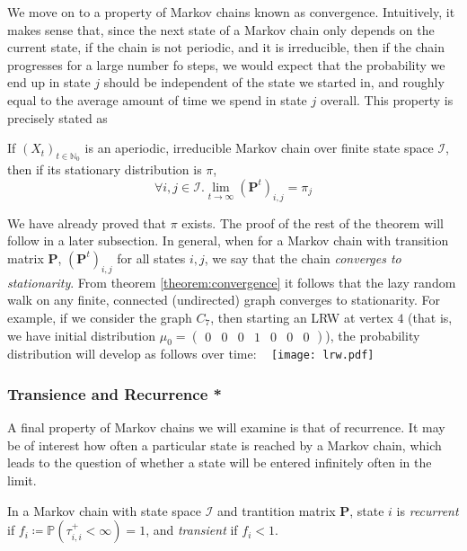 			We move on to a property of Markov chains known as convergence. Intuitively, it makes 
			sense that, since the next state of a Markov chain only depends on the current state,
			if the chain is not periodic, and it is irreducible, then if the chain progresses for
			a large number fo steps, we would expect that the probability we end up in state $j$
			should be independent of the state we started in, and roughly equal to the average amount 
			of time we spend in state $j$ overall. This property is precisely stated as 
			\begin{theorem}
				\label{theorem:convergence}
				If $(X_t)_{t \in \mathbb{N}_0}$ is an aperiodic, irreducible Markov chain over
				finite state space $\mathcal{I}$, then if its stationary distribution is $\pi$,
				$$
					\forall i, j \in \mathcal{I} . \lim_{t \rightarrow \infty} 
					(\mathbf{P}^t)_{i,j} = \pi_j
				$$
			\end{theorem}
			We have already proved that $\pi$ exists. The proof of the rest of the theorem will 
			follow in a later subsection. In general, when for a Markov chain with transition matrix
			$\mathbf{P}$, $(\mathbf{P}^t)_{i,j}$ for all states $i,j$, we say that the chain 
			\emph{converges to stationarity}. From theorem \ref{theorem:convergence} it follows
			that the lazy random walk on any finite, connected (undirected) graph converges to 
			stationarity. For example, if we consider the graph $C_7$, then starting an LRW at 
			vertex $4$ (that is, we have initial distribution $\mu_0 = \begin{pmatrix} 0 & 0 & 0 
			& 1 & 0 & 0 & 0\end{pmatrix}$), the probability distribution will develop as follows over 
			time: \newline\ \newline
			\texttt{[image: lrw.pdf]}
                           	
		\subsubsection{Transience and Recurrence *}
			A final property of Markov chains we will examine is that of recurrence. It may be of
			interest how often a particular state is reached by a Markov chain, which leads to the
			question of whether a state will be entered infinitely often in the limit.
			\begin{definition}
				In a Markov chain with state space $\mathcal{I}$ and trantition matrix $\mathbf
				{P}$, state $i$ is \emph{recurrent} if $f_i \coloneqq \mathbb{P}(\tau^+_{i,i}
				< \infty) = 1$, and \emph{transient} if $f_i < 1$.
			\end{definition}
			\begin{comment}
				We call a Markov chain recurrent if all its states are recurrent themselves.
			\end{comment}
			
